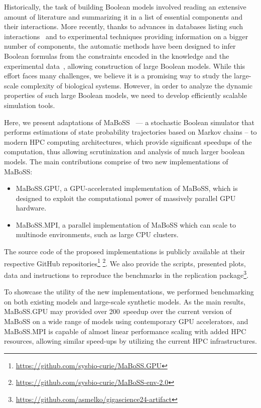 \documentclass[a4paper,num-refs]{oup-contemporary}
\begin{document}
Historically, the task of building Boolean models involved reading an extensive amount of literature and summarizing it in a list of essential components and their interactions.
More recently, thanks to advances in databases listing such interactions~\cite{licata2020signor,turei2016omnipath} and to experimental techniques providing information on a bigger number of components, the automatic methods have been designed to infer Boolean formulas from the constraints encoded in the knowledge and the experimental data~\cite{10.1093/bioinformatics/btaa484,chevalier2020synthesis,benevs2023boolean}, allowing construction of large Boolean models.
While this effort faces many challenges, we believe it is a promising way to study the large-scale complexity of biological systems.
However, in order to analyze the dynamic properties of such large Boolean models, we need to develop efficiently scalable simulation tools.

Here, we present adaptations of MaBoSS~\cite{stoll2012continuous, stoll2017maboss} --- a stochastic Boolean simulator that performs estimations of state probability trajectories based on Markov chains -- to modern HPC computing architectures, which provide significant speedups of the computation, thus allowing scrutinization and analysis of much larger boolean models.
The main contributions comprise of two new implementations of MaBoSS:
\begin{itemize}
    \item MaBoSS.GPU, a GPU-accelerated implementation of MaBoSS, which is designed to exploit the computational power of massively parallel GPU hardware.
    \item MaBoSS.MPI, a parallel implementation of MaBoSS which can scale to multinode environments, such as large CPU clusters.
\end{itemize}

The source code of the proposed implementations is publicly available at their respective GitHub repositories\footnote{\url{https://github.com/sysbio-curie/MaBoSS.GPU}} \footnote{\url{https://github.com/sysbio-curie/MaBoSS-env-2.0}}. We also provide the scripts, presented plots, data and instructions to reproduce the benchmarks in the replication package\footnote{\url{https://github.com/asmelko/gigascience24-artifact}}.

To showcase the utility of the new implementations, we performed benchmarking on both existing models and large-scale synthetic models. As the main results, MaBoSS.GPU may provided over 200\texttimes\ speedup over the current version of MaBoSS on a wide range of models using contemporary GPU accelerators, and MaBoSS.MPI is capable of almost linear performance scaling with added HPC resources, allowing similar speed-ups by utilizing the current HPC infrastructures.
\end{document}
